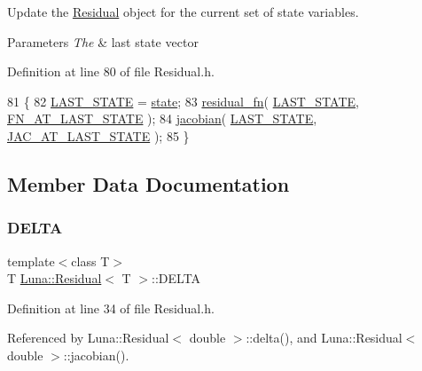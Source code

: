 Update the \hyperlink{classLuna_1_1Residual}{Residual} object for the current set of state variables. 


\begin{DoxyParams}{Parameters}
{\em The} & last state vector \\
\hline
\end{DoxyParams}


Definition at line 80 of file Residual.\+h.


\begin{DoxyCode}
81       \{
82         \hyperlink{classLuna_1_1Residual_abcfc99f00aa4cf3616b32dfd5315dece}{LAST\_STATE} = \hyperlink{classLuna_1_1Residual_a41d9f863aa529f16c5d78fb19b4906bd}{state};
83         \hyperlink{classLuna_1_1Residual_ae1b1ebe3314c788b176bcac7b328de5c}{residual\_fn}( \hyperlink{classLuna_1_1Residual_abcfc99f00aa4cf3616b32dfd5315dece}{LAST\_STATE}, \hyperlink{classLuna_1_1Residual_ac7b086911239d3f42ceec4a826e83543}{FN\_AT\_LAST\_STATE} );
84         \hyperlink{classLuna_1_1Residual_adffbafa712fc6318f3cd05c03b88decb}{jacobian}( \hyperlink{classLuna_1_1Residual_abcfc99f00aa4cf3616b32dfd5315dece}{LAST\_STATE}, \hyperlink{classLuna_1_1Residual_ac76c460240288f84309b587c785df06a}{JAC\_AT\_LAST\_STATE} );
85       \}
\end{DoxyCode}


\subsection{Member Data Documentation}
\mbox{\label{classLuna_1_1Residual_a1bf38ddfa149797de560dcb11c975fef}} 
\subsubsection{\texorpdfstring{D\+E\+L\+TA}{DELTA}}
{\footnotesize\ttfamily template$<$class T$>$ \\
T \hyperlink{classLuna_1_1Residual}{Luna\+::\+Residual}$<$ T $>$\+::D\+E\+L\+TA\hspace{0.3cm}{\ttfamily [protected]}}



Definition at line 34 of file Residual.\+h.



Referenced by Luna\+::\+Residual$<$ double $>$\+::delta(), and Luna\+::\+Residual$<$ double $>$\+::jacobian().

